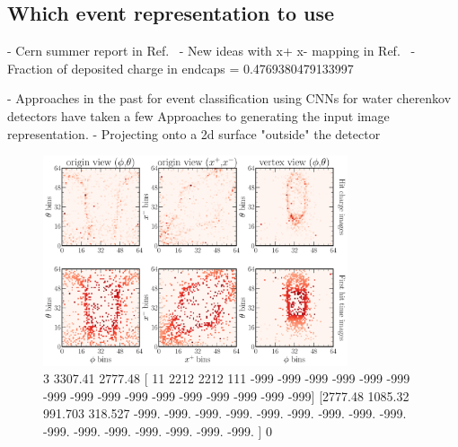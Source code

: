 \subsection{Which event representation to use} %
\label{sec:cvn_baseline_repr} %

- Cern summer report in Ref.~\cite{theodore2016}
- New ideas with x+ x- mapping in Ref.~\cite{berns2020}
- Fraction of deposited charge in endcaps = 0.4769380479133997

- Approaches in the past for event classification using CNNs for water cherenkov detectors have
taken a few Approaches to generating the input image representation.
- Projecting onto a 2d surface "outside" the detector

\begin{figure} %
    \includegraphics[width=0.8\textwidth]{diagrams/7-cvn/chipsnet/explore_nuel_ccres_event.pdf}
    \caption[explore nuel ccres event short]
    {3
        3307.41
        2777.48
            [  11 2212 2212  111 -999 -999 -999 -999 -999 -999 -999 -999 -999 -999
                -999 -999 -999 -999 -999 -999]
            [2777.48  1085.32   991.703  318.527 -999.    -999.    -999.    -999.
                -999.    -999.    -999.    -999.    -999.    -999.    -999.    -999.
                -999.    -999.    -999.    -999.   ]
        0}
    \label{fig:explore_nuel_ccres_event}
\end{figure}

